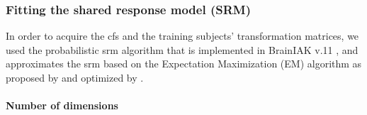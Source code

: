 \subsubsection{Fitting the shared response model (SRM)}



%
In order to acquire the \ac{cfs} and the training subjects' transformation
matrices, we used the probabilistic \ac{srm} algorithm that is implemented in
BrainIAK v.11 \citep[Brain Imaging Analysis Kit;][]{kumar2020brainiak,
kumar2020brainiaktutorial}, and approximates the \ac{srm} based on the
Expectation Maximization (EM) algorithm as proposed by \citet{chen2015reduced}
and optimized by \citet{anderson2016enabling}.


\paragraph{Number of dimensions}


%
%

